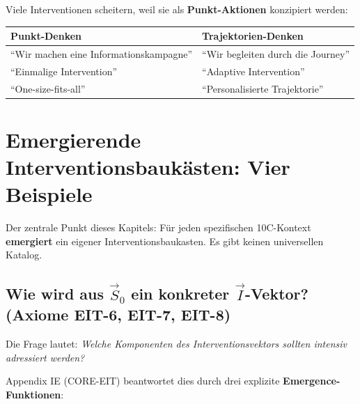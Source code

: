 Viele Interventionen scheitern, weil sie als \textbf{Punkt-Aktionen} konzipiert werden:

\begin{center}
\begin{tabular}{@{}ll@{}}
\toprule
\textbf{Punkt-Denken} & \textbf{Trajektorien-Denken} \\
\midrule
``Wir machen eine Informationskampagne'' & ``Wir begleiten durch die Journey'' \\
``Einmalige Intervention'' & ``Adaptive Intervention'' \\
``One-size-fits-all'' & ``Personalisierte Trajektorie'' \\
\bottomrule
\end{tabular}
\end{center}



\section{Emergierende Interventionsbauk\"{a}sten: Vier Beispiele}
\label{sec:17-examples}

Der zentrale Punkt dieses Kapitels: F\"{u}r jeden spezifischen 10C-Kontext \textbf{emergiert} ein eigener Interventionsbaukasten. Es gibt keinen universellen Katalog.

\subsection{Wie wird aus $\vec{S}_0$ ein konkreter $\vec{I}$-Vektor? (Axiome EIT-6, EIT-7, EIT-8)}
\label{sec:17-emergence-functions}

Die Frage lautet: \textit{Welche Komponenten des Interventionsvektors sollten intensiv adressiert werden?}

Appendix IE (CORE-EIT) beantwortet dies durch drei explizite \textbf{Emergence-Funktionen}:

